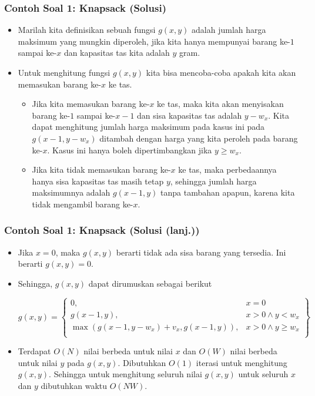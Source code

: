 \begin{frame} 
\frametitle{Contoh Soal 1: Knapsack (Solusi)}
\begin{itemize}
  \item Marilah kita definisikan sebuah fungsi $g(x,y)$ adalah jumlah harga maksimum yang mungkin diperoleh, jika kita hanya mempunyai barang ke-$1$ sampai ke-$x$ dan kapasitas tas kita adalah $y$ gram.
  \item Untuk menghitung fungsi $g(x,y)$ kita bisa mencoba-coba apakah kita akan memasukan barang ke-$x$ ke tas.
  \begin{itemize}
  \item Jika kita memasukan barang ke-$x$ ke tas, maka kita akan menyisakan barang ke-$1$ sampai ke-$x-1$ dan sisa kapasitas tas adalah $y-w_x$. Kita dapat menghitung jumlah harga maksimum pada kasus ini pada $g(x-1,y-w_x)$ ditambah dengan harga yang kita peroleh pada barang ke-$x$. Kasus ini hanya boleh dipertimbangkan jika $y \geq w_x$.
  \item Jika kita tidak memasukan barang ke-$x$ ke tas, maka perbedaannya hanya sisa kapasitas tas masih tetap $y$, sehingga jumlah harga maksimumnya adalah $g(x-1,y)$ tanpa tambahan apapun, karena kita tidak mengambil barang ke-$x$.
  \end{itemize}
\end{itemize}
\end{frame}

\begin{frame} 
\frametitle{Contoh Soal 1: Knapsack (Solusi (lanj.))}
\begin{itemize}
  \item Jika $x=0$, maka $g(x,y)$ berarti tidak ada sisa barang yang tersedia. Ini berarti $g(x,y) = 0$.
  \item Sehingga, $g(x,y)$ dapat dirumuskan sebagai berikut
  \begin{small}
  \[g(x,y) = \left\{\begin{array}{lr}
        0, & x = 0\\
        g(x-1,y), & x > 0 \wedge y < w_x\\
        \max(g(x-1,y-w_x)+v_x,g(x-1,y)), & x > 0 \wedge y \geq w_x\\
        \end{array}\right\}\]
  \end{small}
  \item Terdapat $O(N)$ nilai berbeda untuk nilai $x$ dan $O(W)$ nilai berbeda untuk nilai $y$ pada $g(x,y)$. Dibutuhkan $O(1)$ iterasi untuk menghitung $g(x,y)$. Sehingga untuk menghitung seluruh nilai $g(x,y)$ untuk seluruh $x$ dan $y$ dibutuhkan waktu $O(NW)$.  
\end{itemize}
\end{frame}

